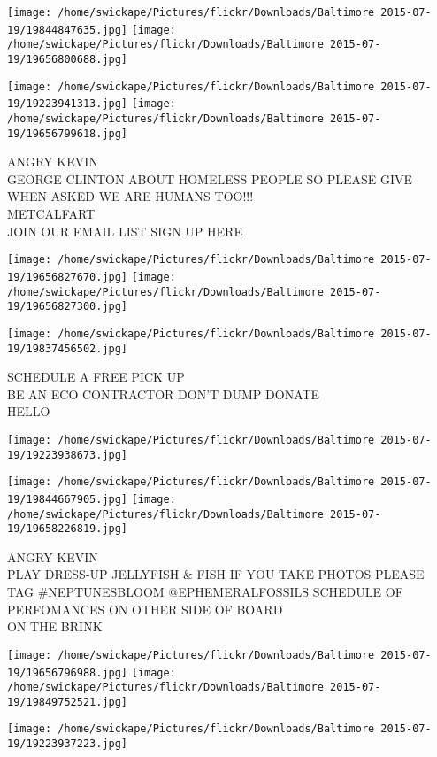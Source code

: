 \documentclass[10pt,letterpaper]{article}
\begin{document}
\texttt{[image: /home/swickape/Pictures/flickr/Downloads/Baltimore 2015-07-19/19844847635.jpg]}
\texttt{[image: /home/swickape/Pictures/flickr/Downloads/Baltimore 2015-07-19/19656800688.jpg]}

\texttt{[image: /home/swickape/Pictures/flickr/Downloads/Baltimore 2015-07-19/19223941313.jpg]}
\texttt{[image: /home/swickape/Pictures/flickr/Downloads/Baltimore 2015-07-19/19656799618.jpg]}

ANGRY KEVIN\\
GEORGE CLINTON ABOUT HOMELESS PEOPLE SO PLEASE GIVE WHEN ASKED WE ARE HUMANS TOO!!!\\
METCALFART\\
JOIN OUR EMAIL LIST SIGN UP HERE
\pagebreak

\texttt{[image: /home/swickape/Pictures/flickr/Downloads/Baltimore 2015-07-19/19656827670.jpg]}
\texttt{[image: /home/swickape/Pictures/flickr/Downloads/Baltimore 2015-07-19/19656827300.jpg]}

\texttt{[image: /home/swickape/Pictures/flickr/Downloads/Baltimore 2015-07-19/19837456502.jpg]}

SCHEDULE A FREE PICK UP\\
BE AN ECO CONTRACTOR DON'T DUMP DONATE\\
HELLO
\pagebreak

\texttt{[image: /home/swickape/Pictures/flickr/Downloads/Baltimore 2015-07-19/19223938673.jpg]}

\vspace{0.25in}
\texttt{[image: /home/swickape/Pictures/flickr/Downloads/Baltimore 2015-07-19/19844667905.jpg]}
\texttt{[image: /home/swickape/Pictures/flickr/Downloads/Baltimore 2015-07-19/19658226819.jpg]}

ANGRY KEVIN\\
PLAY DRESS{-}UP JELLYFISH \& FISH IF YOU TAKE PHOTOS PLEASE TAG \#NEPTUNESBLOOM @EPHEMERALFOSSILS SCHEDULE OF PERFOMANCES ON OTHER SIDE OF BOARD\\
ON THE BRINK
\pagebreak

\texttt{[image: /home/swickape/Pictures/flickr/Downloads/Baltimore 2015-07-19/19656796988.jpg]}
\texttt{[image: /home/swickape/Pictures/flickr/Downloads/Baltimore 2015-07-19/19849752521.jpg]}

\vspace{0.25in}
\texttt{[image: /home/swickape/Pictures/flickr/Downloads/Baltimore 2015-07-19/19223937223.jpg]}
\end{document}
